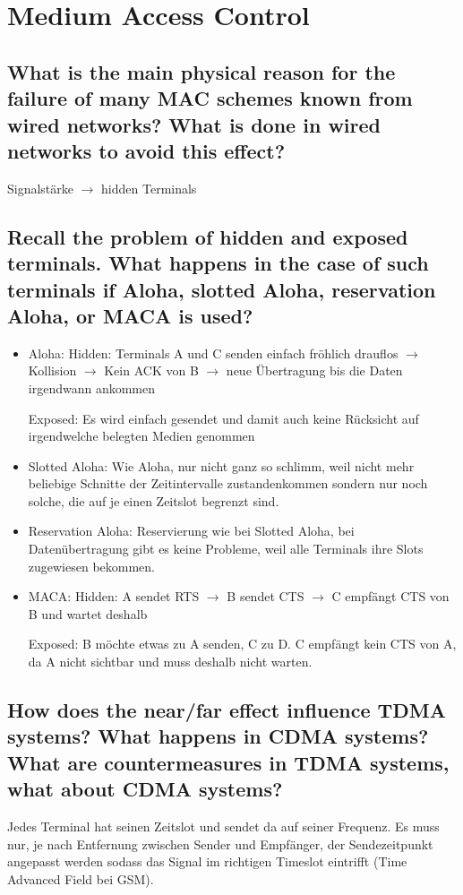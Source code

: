 \section{Medium Access Control}

\subsection{What is the main physical reason for the failure of many MAC schemes known from
wired networks? What is done in wired networks to avoid this effect?}
Signalstärke $\rightarrow$ hidden Terminals


\subsection{Recall the problem of hidden and exposed terminals. What happens in the case of
such terminals if Aloha, slotted Aloha, reservation Aloha, or MACA is used?}
\begin{itemize}

\item Aloha: Hidden: Terminals A und C senden einfach fröhlich drauflos $\rightarrow$ Kollision $\rightarrow$ Kein ACK von B $\rightarrow$ neue Übertragung bis die Daten irgendwann ankommen

Exposed: Es wird einfach gesendet und damit auch keine Rücksicht auf irgendwelche belegten Medien genommen

\item Slotted Aloha: Wie Aloha, nur nicht ganz so schlimm, weil nicht mehr beliebige Schnitte der Zeitintervalle zustandenkommen sondern nur noch solche, die auf je einen Zeitslot begrenzt sind.

\item Reservation Aloha: Reservierung wie bei Slotted Aloha, bei Datenübertragung gibt es keine Probleme, weil alle Terminals ihre Slots zugewiesen bekommen.

\item MACA: Hidden: A sendet RTS $\rightarrow$ B sendet CTS $\rightarrow$ C empfängt CTS von B und wartet deshalb

Exposed: B möchte etwas zu A senden, C zu D. C empfängt kein CTS von A, da A nicht sichtbar und muss deshalb nicht warten.

\end{itemize}

\subsection{How does the near/far effect influence TDMA systems? What happens in CDMA
systems? What are countermeasures in TDMA systems, what about CDMA systems?}
Jedes Terminal hat seinen Zeitslot und sendet da auf seiner Frequenz. Es muss nur, je nach Entfernung zwischen Sender und Empfänger, der Sendezeitpunkt angepasst werden sodass das Signal im richtigen Timeslot eintrifft (Time Advanced Field bei GSM).

